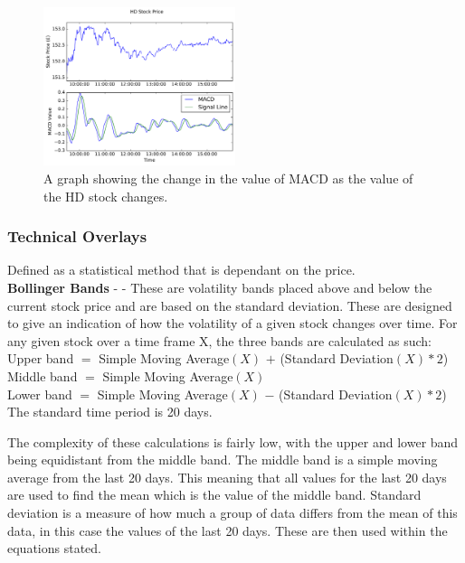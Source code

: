 \documentclass[conference]{IEEEtran}
\begin{document}
\begin{figure}
\includegraphics[width=0.5\textwidth, angle=0]{HDDayMACD.pdf}
\caption{A graph showing the change in the value of MACD as the value of the HD stock changes.}
\label{fig:HDDayMACD}
\end{figure}

\subsubsection{Technical Overlays} Defined as a statistical method that is dependant on the price. \\

\textbf{Bollinger Bands} - \cite{Bollinger1992} - These are volatility bands placed above and below the current stock price and are based on the standard deviation. These are designed to give an indication of how the volatility of a given stock changes over time. For any given stock over a time frame X, the three bands are calculated as such:\\

\noindent
Upper band $=$ Simple Moving Average$(X)$ $+$ (Standard Deviation$(X) * 2$)\\
Middle band $=$ Simple Moving Average$(X)$\\
Lower band $=$ Simple Moving Average$(X)$ $-$ (Standard Deviation$(X) * 2$)\\
The standard time period is 20 days.

The complexity of these calculations is fairly low, with the upper and lower band being equidistant from the middle band. The middle band is a simple moving average from the last 20 days. This meaning that all values for the last 20 days are used to find the mean which is the value of the middle band. Standard deviation is a measure of how much a group of data differs from the mean of this data, in this case the values of the last 20 days. These are then used within the equations stated.\\
\end{document}
